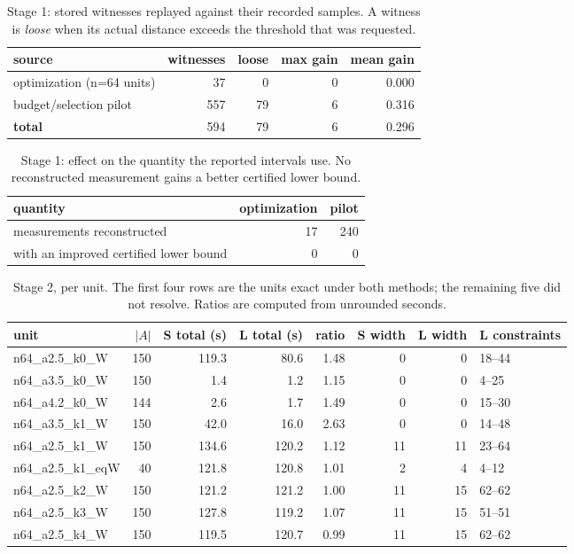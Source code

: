 \begin{table}[htbp]
\centering
\begin{tabular}{lrrrr}
\toprule
source & witnesses & loose & max gain & mean gain \\
\midrule
optimization (n=64 units) & 37 & 0 & 0 & 0.000 \\
budget/selection pilot & 557 & 79 & 6 & 0.316 \\
\midrule
\textbf{total} & 594 & 79 & 6 & 0.296 \\
\bottomrule
\end{tabular}
\caption{Stage 1: stored witnesses replayed against their recorded samples. A witness is \emph{loose} when its actual distance exceeds the threshold that was requested.}
\label{tab:stage1}
\end{table}

\begin{table}[htbp]
\centering
\begin{tabular}{lrr}
\toprule
quantity & optimization & pilot \\
\midrule
measurements reconstructed & 17 & 240 \\
with an improved certified lower bound & 0 & 0 \\
\bottomrule
\end{tabular}
\caption{Stage 1: effect on the quantity the reported intervals use. No reconstructed measurement gains a better certified lower bound.}
\label{tab:stage1agg}
\end{table}

\begin{table}[htbp]
\centering
\begin{tabular}{lrrrrrrl}
\toprule
unit & $|A|$ & S total (s) & L total (s) & ratio & S width & L width & L constraints \\
\midrule
n64\_a2.5\_k0\_W & 150 & 119.3 & 80.6 & 1.48 & 0 & 0 & 18--44 \\
n64\_a3.5\_k0\_W & 150 & 1.4 & 1.2 & 1.15 & 0 & 0 & 4--25 \\
n64\_a4.2\_k0\_W & 144 & 2.6 & 1.7 & 1.49 & 0 & 0 & 15--30 \\
n64\_a3.5\_k1\_W & 150 & 42.0 & 16.0 & 2.63 & 0 & 0 & 14--48 \\
\midrule
n64\_a2.5\_k1\_W & 150 & 134.6 & 120.2 & 1.12 & 11 & 11 & 23--64 \\
n64\_a2.5\_k1\_eqW & 40 & 121.8 & 120.8 & 1.01 & 2 & 4 & 4--12 \\
n64\_a2.5\_k2\_W & 150 & 121.2 & 121.2 & 1.00 & 11 & 15 & 62--62 \\
n64\_a2.5\_k3\_W & 150 & 127.8 & 119.2 & 1.07 & 11 & 15 & 51--51 \\
n64\_a2.5\_k4\_W & 150 & 119.5 & 120.7 & 0.99 & 11 & 15 & 62--62 \\
\bottomrule
\end{tabular}
\caption{Stage 2, per unit. The first four rows are the units exact under both methods; the remaining five did not resolve. Ratios are computed from unrounded seconds.}
\label{tab:perunit}
\end{table}

